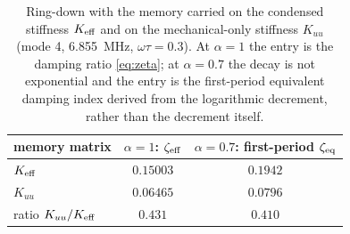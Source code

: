 \begin{table}[!htbp]
\centering
\small
\caption{Ring-down with the memory carried on the condensed stiffness
$K_{\rm eff}$ and on the mechanical-only stiffness $K_{uu}$ (mode 4,
\SI{6.855}{MHz}, $\omega\tau=0.3$). At $\alpha=1$ the entry is the damping
ratio \eqref{eq:zeta}; at $\alpha=0.7$ the decay is not exponential and the
entry is the first-period equivalent damping index derived from the
logarithmic decrement, rather than the decrement itself.}
\label{tab:memory}
\begin{tabular}{@{}lcc@{}}
\toprule
memory matrix & $\alpha=1$: $\zeta_{\rm eff}$ &
  $\alpha=0.7$: first-period $\zeta_{\rm eq}$ \\
\midrule
$K_{\rm eff}$ & $0.15003$ & $0.1942$ \\
$K_{uu}$      & $0.06465$ & $0.0796$ \\
\midrule
ratio $K_{uu}/K_{\rm eff}$ & $0.431$ & $0.410$ \\
\bottomrule
\end{tabular}
\end{table}
